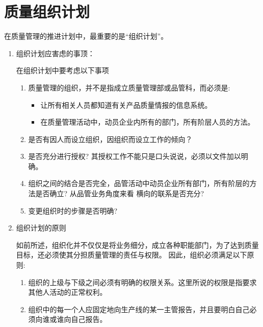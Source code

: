 \section {质量组织计划}

    在质量管理的推进计划中，最重要的是“组织计划”。

    \begin{enumerate}
        \item 组织计划应害虑的事顶：

            在组织计划中要考虑以下事项

            \begin{enumerate}
                \item 质量管理的组织，并不是指成立质量管理部或品管科，而必须是:
                    \begin{itemize}
                        \item 让所有相关人员都知道有关产品质量情报的信息系统。

                        \item 在质量管理活动中，动员企业内所有的部门，所有阶层人员的方法。
                    \end{itemize}

                \item 是否有因人而设立组织，因组织而设立工作的倾向？

                \item 是否充分进行授权? 其授权工作不能只是口头说说，必须以文件加以明确。

                \item 组织之间的结合是否完全，品管活动中动员企业所有部门，所有阶层的方法是否确立? 从品管业务角度来看 横向的联系是否充分?

                \item 变更组织时的步骤是否明确?

             \end{enumerate}
        \item 组织计划的原则

        如前所述，组织化并不仅仅是将业务细分，成立各种职能部门，为了达到质量目标，还必须使其分担质量管理的责任与权限。 因此，组织必须满足以下原则:

            \begin{enumerate}
                \item 组织的上级与下级之间必须有明确的权限关系。这里所说的权限是指要求其他人活动的正常权利。

                \item 组织中的每一个人应固定地向生产线的某一主管报告，并且要明白自己必须向谁或谁向自己报告。


\end{enumerate}
\end{enumerate}
